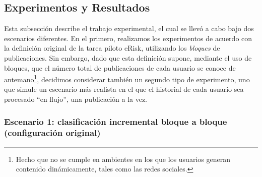 \subsection{Experimentos y Resultados}
\label{sec:exp_and_results}

Esta subsección describe el trabajo experimental, el cual se llevó a cabo bajo dos escenarios diferentes.
En el primero, realizamos los experimentos de acuerdo con la definición original de la tarea piloto eRisk, utilizando los \emph{bloques} de publicaciones.
Sin embargo, dado que esta definición supone, mediante el uso de bloques, que el número total de publicaciones de cada usuario se conoce de antemano\footnote{Hecho que no se cumple en ambientes en  los que los usuarios generan contenido dinámicamente, tales como las redes sociales.}, decidimos considerar también un segundo tipo de experimento, uno que simule un escenario más realista en el que el historial de cada usuario sea procesado ``en flujo'', una publicación a la vez.


\subsubsection{Escenario 1: clasificación incremental bloque a bloque (configuración original)} 

